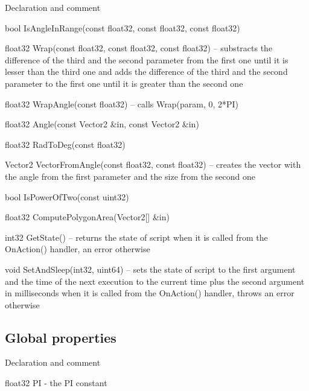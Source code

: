 \begin{titled-itemize}{Declaration and comment}
  \item bool IsAngleInRange(const float32, const float32, const float32)
  \item float32 Wrap(const float32, const float32, const float32) -- substracts the difference of the third and the second parameter from the first one until it is lesser than the third one and adds the difference of the third and the second parameter to the first one until it is greater than the second one
  \item float32 WrapAngle(const float32) -- calls Wrap(param, 0, 2*PI)
  \item float32 Angle(const Vector2 \&in, const Vector2 \&in)
  \item float32 RadToDeg(const float32)
  \item Vector2 VectorFromAngle(const float32, const float32) -- creates the vector with the angle from the first parameter and the size from the second one
  \item bool IsPowerOfTwo(const uint32)
  \item float32 ComputePolygonArea(Vector2[] \&in)
  \item int32 GetState() -- returns the state of script when it is called from the OnAction() handler, an error otherwise
  \item void SetAndSleep(int32, uint64) -- sets the state of script to the first argument and the time of the next execution to the current time plus the second argument in milliseconds when it is called from the OnAction() handler, throws an error otherwise
\end{titled-itemize}

\subsection{Global properties}

\begin{titled-itemize}{Declaration and comment}
  \item float32 PI - the PI constant
\end{titled-itemize}